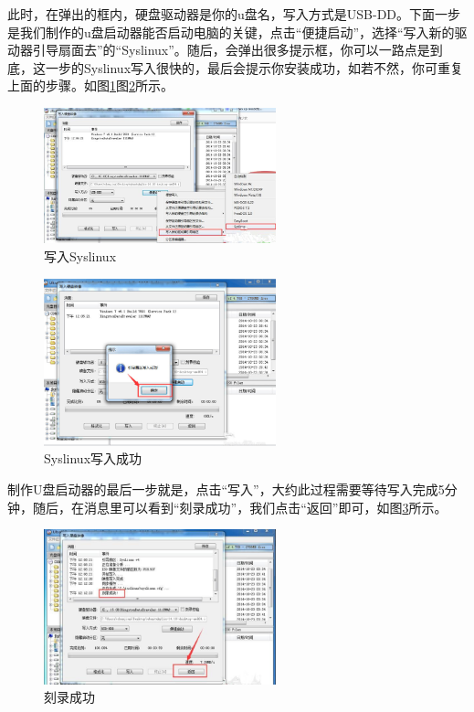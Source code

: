 \documentclass{article}
\begin{document}
  此时，在弹出的框内，硬盘驱动器是你的u盘名，写入方式是USB-DD。下面一步是我们制作的u盘启动器能否启动电脑的关键，点击“便捷启动”，选择“写入新的驱动器引导扇面去”的“Syslinux”。随后，会弹出很多提示框，你可以一路点是到底，这一步的Syslinux写入很快的，最后会提示你安装成功，如若不然，你可重复上面的步骤。如图\ref{tu2}图\ref{tu3}所示。
\begin{figure}[!htb] %
\centering
\includegraphics[width=0.6\textwidth]{tu2.jpeg}
\caption{\small 写入Syslinux}
\label{tu2}
\end{figure}  

\begin{figure}[!htb] %
\centering
\includegraphics[width=0.6\textwidth]{tu3.jpeg}
\caption{\small Syslinux写入成功}
\label{tu3}
\end{figure}  
  制作U盘启动器的最后一步就是，点击“写入”，大约此过程需要等待写入完成5分钟，随后，在消息里可以看到“刻录成功”，我们点击“返回”即可，如图\ref{tu5}所示。

\begin{figure}[!htb] %
\centering
\includegraphics[width=0.6\textwidth]{tu5.jpeg}
\caption{\small 刻录成功}
\label{tu5}
\end{figure} 
 
\end{document}

